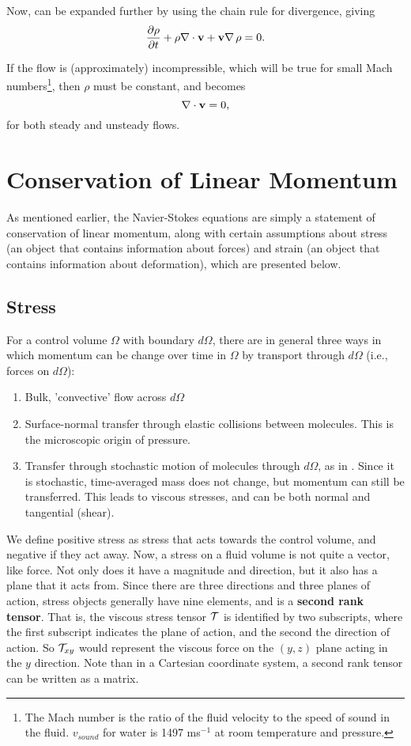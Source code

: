 Now,  can be expanded further by using the chain rule for divergence, giving
\begin{equation}\label{eq:expandedMass}
\pder{1}{\rho}{t} + \rho\Div{\Vector{v}} + \Vector{v}\Grad{\rho}=0.
\end{equation}

If the flow is (approximately) incompressible, which will be true for small Mach numbers\footnote{The Mach number is the ratio of the fluid velocity to the speed of sound in the fluid. $v_{sound}$ for water is 1497 ms$^{-1}$ at room temperature and pressure.}, then $\rho$ must be constant, and  becomes 
\begin{equation}\label{eq:consMassIncomp}
\nabla\cdot\mathbf{v} = 0,
\end{equation}
for both steady and unsteady flows.

\section{Conservation of Linear Momentum} 

As mentioned earlier, the Navier-Stokes equations are simply a statement of conservation of linear momentum, along with certain assumptions about stress (an object that contains information about forces) and strain (an object that contains information about deformation), which are presented below. 
\subsection{Stress}
For a control volume $\Omega$ with boundary $d\Omega$, there are in general three ways in which momentum can be change over time in $\Omega$ by transport through $d\Omega$ (i.e., forces on $d\Omega$): 
\begin{enumerate}
\item{Bulk, 'convective' flow across $d\Omega$}
\item{Surface-normal transfer through elastic collisions between molecules. This is the microscopic origin of pressure.}
\item{Transfer through stochastic motion of molecules through $d\Omega$, as in . Since it is stochastic, time-averaged mass does not change, but momentum can still be transferred. This leads to viscous stresses, and can be both normal and tangential (shear).}
\end{enumerate}

We define positive stress as stress that acts towards the control volume, and negative if they act away. Now, a stress on a fluid volume is not quite a vector, like force. Not only does it have a magnitude and direction, but it also has a plane that it acts from. Since there are three directions and three planes of action, stress objects generally have nine elements, and is a {\bf second rank tensor}. That is, the viscous stress tensor $\mathcal{T}$ is identified by two subscripts, where the first subscript indicates the plane of action, and the second the direction of action. So $\mathcal{T}_{xy}$ would represent the viscous force on the $(y,z)$ plane acting in the $y$ direction. Note than in a Cartesian coordinate system, a second rank tensor can be written as a matrix. 

